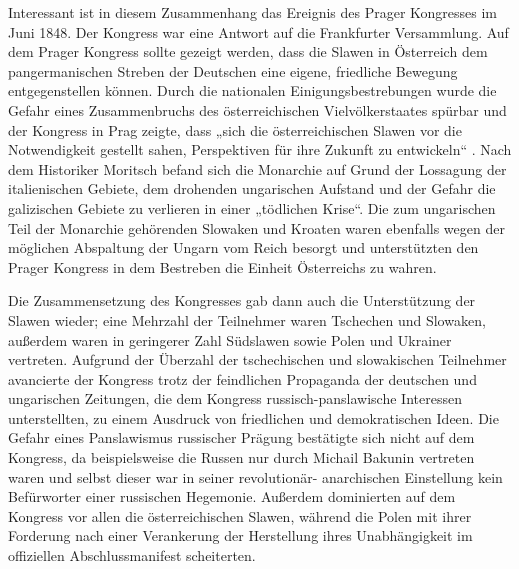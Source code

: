\documentclass{../../sem_paper}
\begin{document}
Interessant ist in diesem Zusammenhang das Ereignis des Prager Kongresses im Juni 1848.
Der Kongress war eine Antwort auf die Frankfurter Versammlung. Auf dem Prager Kongress
sollte gezeigt werden, dass die Slawen in Österreich dem pangermanischen Streben der
Deutschen eine eigene, friedliche Bewegung entgegenstellen können. Durch die nationalen
Einigungsbestrebungen wurde die Gefahr eines Zusammenbruchs des österreichischen
Vielvölkerstaates spürbar und der Kongress in Prag zeigte, dass „sich die österreichischen
Slawen vor die Notwendigkeit gestellt sahen, Perspektiven für ihre Zukunft zu entwickeln“\autocite[6]{moritsch}
. Nach dem Historiker Moritsch\autocite[7]{moritsch} befand sich die Monarchie auf Grund der
Lossagung der italienischen Gebiete, dem drohenden ungarischen Aufstand und der Gefahr
die galizischen Gebiete zu verlieren in einer „tödlichen Krise“. Die zum ungarischen Teil der
Monarchie gehörenden Slowaken und Kroaten waren ebenfalls wegen der möglichen
Abspaltung der Ungarn vom Reich besorgt und unterstützten den Prager Kongress in dem
Bestreben die Einheit Österreichs zu wahren.

Die Zusammensetzung des Kongresses gab dann auch die Unterstützung der Slawen wieder;
eine Mehrzahl der Teilnehmer waren Tschechen und Slowaken, außerdem waren in geringerer
Zahl Südslawen sowie Polen und Ukrainer vertreten.\autocite[17]{moritsch}
Aufgrund der Überzahl der tschechischen und slowakischen Teilnehmer avancierte der
Kongress trotz der feindlichen Propaganda der deutschen und ungarischen Zeitungen, die dem
Kongress russisch-panslawische Interessen unterstellten\autocite[69]{pokorny}, zu einem
Ausdruck von friedlichen und demokratischen Ideen. Die Gefahr eines Panslawismus
russischer Prägung bestätigte sich nicht auf dem Kongress, da beispielsweise die Russen nur
durch Michail Bakunin vertreten waren und selbst dieser war in seiner revolutionär-
anarchischen Einstellung kein Befürworter einer russischen Hegemonie. Außerdem
dominierten auf dem Kongress vor allen die österreichischen Slawen, während die Polen mit
ihrer Forderung nach einer Verankerung der Herstellung ihres Unabhängigkeit im offiziellen
Abschlussmanifest scheiterten.
\end{document}

